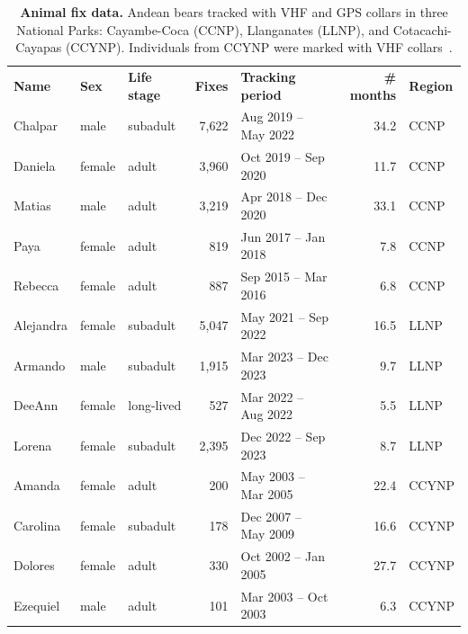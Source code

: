 \documentclass[lineno,referee,pdflatex,sn-vancouver-num]{sn-jnl}%
\newlength\savedwidth
\newcommand\thickhline{\noalign{\global\savedwidth\arrayrulewidth\global\arrayrulewidth 2pt}%
\hline
\noalign{\global\arrayrulewidth\savedwidth}}
\theoremstyle{thmstyleone}%
\theoremstyle{thmstyletwo}%
\theoremstyle{thmstylethree}%
\begin{document}
\begin{table}[t]
  \caption{\textbf{Animal fix data.} Andean bears tracked with VHF and GPS collars in three National Parks: Cayambe-Coca (CCNP), Llanganates (LLNP), and Cotacachi-Cayapas (CCYNP). Individuals from CCYNP were marked with VHF collars~\cite{castellanosAndeanBearHome2011}.}
\label{table1}
  \small\setlength{\tabcolsep}{4pt}%
  \begin{tabular}{|l|l|l|r|l|r|l|}
    \hline
    \textbf{Name} & \textbf{Sex} & \textbf{Life stage} & \textbf{Fixes} & \textbf{Tracking period} & \textbf{\# months} & \textbf{Region} \\ \thickhline
    Chalpar   & male   & subadult              & 7,622 & Aug 2019 -- May 2022  & 34.2 & CCNP      \\ \hline
    Daniela   & female & adult                 & 3,960 & Oct 2019 -- Sep 2020  & 11.7 & CCNP      \\ \hline
    Matias    & male   & adult                 & 3,219 & Apr 2018 -- Dec 2020  & 33.1 & CCNP      \\ \hline
    Paya      & female & adult                 &   819 & Jun 2017 -- Jan 2018  &  7.8 & CCNP      \\ \hline
    Rebecca   & female & adult                 &   887 & Sep 2015 -- Mar 2016  &  6.8 & CCNP      \\ \hline
    Alejandra & female & subadult              & 5,047 & May 2021 -- Sep 2022  & 16.5 & LLNP                  \\ \hline
    Armando   & male   & subadult              & 1,915 & Mar 2023 -- Dec 2023  &  9.7 & LLNP                  \\ \hline
    DeeAnn    & female & long-lived &   527 & Mar 2022 -- Aug 2022  &  5.5 & LLNP                  \\ \hline
    Lorena    & female & subadult              & 2,395 & Dec 2022 -- Sep 2023  &  8.7 & LLNP                  \\ \hline
    Amanda    & female & adult                 &   200 & May 2003 -- Mar 2005  & 22.4 & CCYNP \\ \hline
    Carolina  & female & subadult              &   178 & Dec 2007 -- May 2009  & 16.6 & CCYNP \\ \hline
    Dolores   & female & adult                 &   330 & Oct 2002 -- Jan 2005  & 27.7 & CCYNP \\ \hline
    Ezequiel  & male   & adult                 &   101 & Mar 2003 -- Oct 2003  &  6.3 & CCYNP \\ \hline

\end{tabular}
\end{table}
\end{document}
